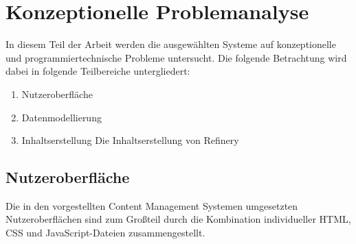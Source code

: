 \chapter{Konzeptionelle Problemanalyse}

In diesem Teil der Arbeit werden die ausgewählten Systeme auf konzeptionelle und programmiertechnische Probleme untersucht. Die folgende Betrachtung wird dabei in folgende Teilbereiche untergliedert:

\begin{enumerate}
\item Nutzeroberfläche
\item Datenmodellierung
\item Inhaltserstellung
Die Inhaltserstellung von Refinery

\end{enumerate}


\section{Nutzeroberfläche}


Die in den vorgestellten Content Management Systemen umgesetzten Nutzeroberflächen sind zum Großteil durch die Kombination individueller HTML, CSS und JavaScript-Dateien zusammengestellt.

